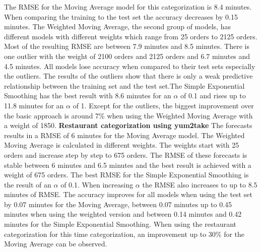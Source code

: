 The RMSE for the Moving Average model for this categorization is 8.4 minutes. When comparing the training to the test set the accuracy decreases by 0.15 minutes. The Weighted Moving Average, the second group of models, has different models with different weights which range from 25 orders to 2125 orders. Most of the resulting RMSE are between 7.9 minutes and 8.5 minutes. There is one outlier with the weight of 2100 orders and 2125 orders and 6.7 minutes and 4.5 minutes. All models lose accuracy when compared to their test sets especially the outliers. The results of the outliers show that there is only a weak predictive relationship between the training set and the test set.\newline The Simple Exponential Smoothing has the best result with 8.6 minutes for an $\alpha$ of 0.1 and rises up to 11.8 minutes for an $\alpha$ of 1.
Except for the outliers, the biggest improvement over the basic approach is around 7\% when using the Weighted Moving Average with a weight of 1850.
\newline\newline\textbf{Restaurant categorization using yum2take}\newline
The forecasts results in a RMSE of 6 minutes for the Moving Average model. The Weighted Moving Average is calculated in different weights. The weights start with 25 orders and increase step by step to 675 orders. The RMSE of these forecasts is stable between 6 minutes and 6.5 minutes and the best result is achieved with a weight of 675 orders. The best RMSE for the Simple Exponential Smoothing is the result of an $\alpha$ of 0.1. When increasing $\alpha$ the RMSE also increases to up to 8.5 minutes of RMSE. The accuracy improves for all models when using the test set by 0.07 minutes for the Moving Average, between 0.07 minutes up to 0.45 minutes when using the weighted version and between 0.14 minutes and 0.42 minutes for the Simple Exponential Smoothing.\newline
When using the restaurant categorization for this time categorization, an improvement up to 30\% for the Moving Average can be observed.
